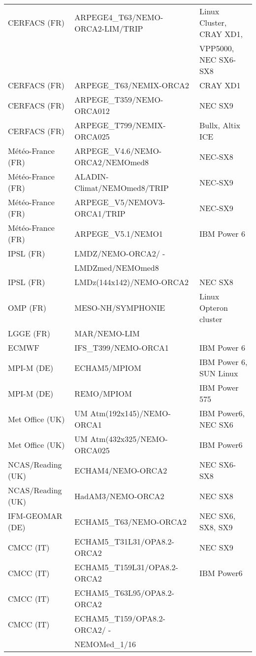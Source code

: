 \begin{center}
\begin{longtable}{|l|l|l|}
CERFACS (FR) &	ARPEGE4\_T63/NEMO-ORCA2-LIM/TRIP &	Linux Cluster, CRAY XD1,\\
&    &    VPP5000, NEC SX6-SX8 \\
CERFACS (FR) & 	ARPEGE\_T63/NEMIX-ORCA2 &		CRAY XD1 \\
CERFACS (FR) & 	ARPEGE\_T359/NEMO-ORCA012  &			NEC SX9 \\
CERFACS (FR) & 	ARPEGE\_T799/NEMIX-ORCA025 &			Bullx, Altix ICE \\
M\'et\'eo-France (FR) &	ARPEGE\_V4.6/NEMO-ORCA2/NEMOmed8  &	NEC-SX8 \\
M\'et\'eo-France (FR) &	ALADIN-Climat/NEMOmed8/TRIP &		NEC-SX9 \\
M\'et\'eo-France (FR) &	ARPEGE\_V5/NEMOV3-ORCA1/TRIP &          NEC-SX9 \\
M\'et\'eo-France (FR) &	ARPEGE\_V5.1/NEMO1 &                    IBM Power 6 \\
IPSL (FR) &	LMDZ/NEMO-ORCA2/ - & \\
          &     LMDZmed/NEMOmed8   & \\
IPSL (FR) &	LMDz(144x142)/NEMO-ORCA2	 & NEC SX8 \\
OMP (FR) &	MESO-NH/SYMPHONIE &				Linux Opteron cluster \\
LGGE (FR) &	MAR/NEMO-LIM & \\
ECMWF & 	IFS\_T399/NEMO-ORCA1 	 &	IBM Power 6 \\
MPI-M (DE) &	ECHAM5/MPIOM  &               IBM Power 6, SUN Linux \\
MPI-M (DE) &	REMO/MPIOM &			IBM Power 575 \\
Met Office (UK) & 	UM Atm(192x145)/NEMO-ORCA1 &			IBM Power6, NEC SX6 \\
Met Office (UK) &  UM Atm(432x325/NEMO-ORCA025 &	IBM Power6 \\		
NCAS/Reading (UK) & ECHAM4/NEMO-ORCA2 &	NEC SX6-SX8 \\
NCAS/Reading (UK) & HadAM3/NEMO-ORCA2 &	NEC SX8 \\
IFM-GEOMAR (DE) & ECHAM5\_T63/NEMO-ORCA2 &	NEC SX6, SX8, SX9 \\	
CMCC (IT) &	ECHAM5\_T31L31/OPA8.2-ORCA2 &	NEC SX9 \\
CMCC (IT) &	ECHAM5\_T159L31/OPA8.2-ORCA2  &   IBM Power6 \\
CMCC (IT) &	ECHAM5\_T63L95/OPA8.2-ORCA2 &   \\   
CMCC (IT) &	ECHAM5\_T159/OPA8.2-ORCA2/ - & \\
          &     NEMOMed\_1/16                & \\   

\end{longtable}
\end{center}
